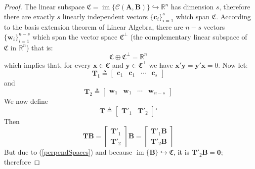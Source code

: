 \documentclass[a4paper,10pt,oneside]{book}
\begin{document}
\begin{proof}
 The linear subspace $\mathfrak{C}=\operatorname{im}\{\mathcal{C}(\mathbf{A},\mathbf{B})\}\hookrightarrow \mathbb{R}^n$ has dimension $s$, therefore there are exactly $s$ linearly independent vectors $\{\mathbf{c}_i\}_{i=1}^{s}$ which span $\mathfrak{C}$. According to the basis extension theorem of Linear Algebra, there are $n-s$ vectors $\{\mathbf{w}_i\}_{i=1}^{n-s}$ which span the vector space $\mathfrak{C}^\perp$ (the complementary linear subspace of $\mathfrak{C}$ in $\mathbb{R}^n$) that is:
\begin{equation}
 \mathfrak{C}\oplus \mathfrak{C}^\perp = \mathbb{R}^n \label{perpendSpaces}
\end{equation}
which implies that, for every $\mathbf{x}\in\mathfrak{C}$ and $\mathbf{y}\in\mathfrak{C}^\perp$ we have $\mathbf{x}'\mathbf{y}=\mathbf{y}'\mathbf{x}=0$. Now let:
\begin{equation}
 \mathbf{T}_1\triangleq\left[ {\begin{array}{cccc}
      \mathbf{c}_{1} & \mathbf{c}_{1} & \cdots & \mathbf{c}_{s}
\end{array} } \right]
\end{equation}
and 
\begin{equation}
 \mathbf{T}_2\triangleq\left[ {\begin{array}{cccc}
      \mathbf{w}_{1} & \mathbf{w}_{1} & \cdots & \mathbf{w}_{n-s}
\end{array} } \right]
\end{equation}
We now define
\begin{equation}
 \mathbf{T}\triangleq\left[ {\begin{array}{cc}
      \mathbf{T}'_{1} & \mathbf{T}'_{2}
\end{array} } \right]'
\end{equation}
Then
\begin{equation}
 \mathbf{TB}=\left[ {\begin{array}{c} \mathbf{T}'_{1} \\ \mathbf{T}'_{2} \end{array} } \right]\mathbf{B}=\left[ {\begin{array}{c}
      \mathbf{T}'_{1}\mathbf{B} \\ \mathbf{T}'_{2}\mathbf{B}
\end{array} } \right]
\end{equation}
But due to (\ref{perpendSpaces}) and because $\operatorname{im}\{ \mathbf{B} \} \hookrightarrow \mathfrak{C}$, it is $\mathbf{T}'_{2}\mathbf{B}=\mathbf{0}$; therefore

\end{proof}
\end{document}
